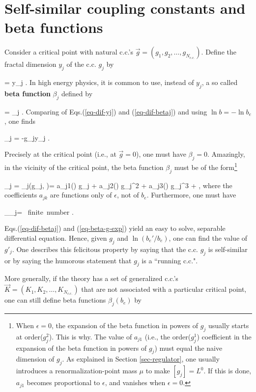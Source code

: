 \documentclass[12pt]{article}
\begin{document}
\section{Self-similar coupling constants and beta functions}

Consider
a critical point
with natural c.c.'s
$\vec{g} =(g_1, g_2, \ldots,
g_{N_{c.c.}})$.
Define the fractal
dimension $y_j$ of the c.c. $g_j$ by

\beq
{}=
y_j
\;.
\label{eq-dif-yj}
\eeq
In high energy physics, it
is common to
use, instead of $y_j$, a so called
\textbf{beta function} $\beta_j$
defined by

\beq
{}=
\beta_j
\;.
\label{eq-dif-betaj}
\eeq
Comparing of Eqs.(\ref{eq-dif-yj})
and (\ref{eq-dif-betaj})
and using $\ln b = -\ln b_e$,
one finds

\beq
\beta_j = -g_j\;y_j
\;.
\eeq

Precisely at the critical point
(i.e., at $\vec{g}=0$),
one must have
$\beta_j=0$.
Amazingly, in the vicinity of
the critical point, the
beta function
$\beta_j$ must be of the
form\footnote{When $\epsilon=0$,
the expansion
of  the beta function
in powers of $g_j$
usually starts
at order($g_j^2$).
This is why. The value of $a_{j1}$ (i.e., the order($g_j^1$)
coefficient in the expansion
of the beta function
in powers of $g_j$)
must equal the naive dimension of
$g_j$. As explained in Section
\ref{sec-regulator}, one usually introduces
a renormalization-point mass
 $\mu$ to make $[g_j]=L^0$.
If this is done, $a_{j1}$
becomes proportional to $\epsilon$,
and vanishes when $\epsilon=0$.
}

\beq
\beta_j = \beta_j(g_j, \epsilon)=
a_{j1}(\epsilon) g_j
+ a_{j2}(\epsilon) g_j^2
+ a_{j3}(\epsilon) g_j^3
+\cdots
\;,
\label{eq-beta-g-exp}
\eeq
where the
coefficients $a_{jk}$
are functions only of $\epsilon$,
not of $b_e$. Furthermore, one
must have

\beq
\lim_{\epsilon{}}\beta_j= \mbox{ finite number}
\;.
\eeq


Eqs.(\ref{eq-dif-betaj})
and (\ref{eq-beta-g-exp}) yield
an easy to
solve, separable differential equation. Hence,
given $g_j$ and
$\ln (b_e'/b_e)$, one can find the value of
$g'_j$.
One describes this felicitous property
by saying that the c.c. $g_j$ is self-similar
or by saying the humorous
statement that $g_j$
is a ``running c.c.".


More generally, if the
theory has a set of
generalized c.c.'s
$\vec{K} =(K_1, K_2, \ldots,
K_{N_{c.c.}})$
that are not associated with
a particular critical point,
one can still define beta
functions $\beta_j(b_e)$
by
\end{document}
